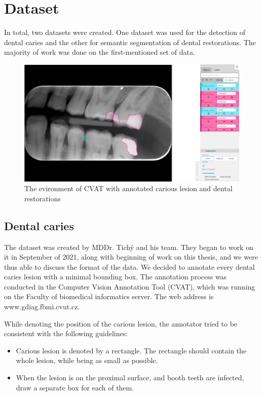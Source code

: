 \chapter{Dataset}
\label{chapter:dataset}
In total, two datasets were created. One dataset was used for the detection of dental caries and the other for semantic segmentation of dental restorations. The majority of work was done on the first-mentioned set of data.

\begin{figure}
    \centering
    \includegraphics[width=\linewidth]{images/cvat.png}
    \caption{The evironment of CVAT with annotated carious lesion and dental restorations}
    \label{fig:cvat}
\end{figure}

\section{Dental caries}
The dataset was created by MDDr. Tichý and his team. They began to work on it in September of 2021, along with beginning of work on this thesis, and we were thus able to discuss the format of the data. We decided to annotate every dental caries lesion with a minimal bounding box. The annotation process was conducted in the Computer Vision Annotation Tool (CVAT), which was running on the Faculty of biomedical informatics server. The web address is www.gdiag.fbmi.cvut.cz.

While denoting the position of the carious lesion, the annotator tried to be consistent with the following guidelines:

\begin{itemize}
    \item Carious lesion is denoted by a rectangle. The rectangle should contain the whole lesion, while being as small as possible.
    \item When the lesion is on the proximal surface, and booth teeth are infected, draw a separate box for each of them.
\end{itemize}

